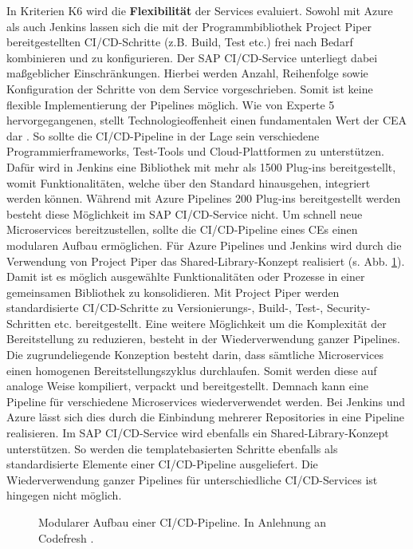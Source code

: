 In Kriterien K6 wird die \textbf{Flexibilität} der Services evaluiert. Sowohl mit Azure als auch Jenkins lassen sich die mit der Programmbibliothek Project Piper bereitgestellten CI/CD-Schritte (z.B. Build, Test etc.) frei nach Bedarf kombinieren und zu konfigurieren. Der SAP CI/CD-Service unterliegt dabei maßgeblicher Einschränkungen. Hierbei werden Anzahl, Reihenfolge sowie Konfiguration der Schritte von dem Service vorgeschrieben. Somit ist keine flexible Implementierung der Pipelines möglich. Wie von Experte 5 hervorgegangenen, stellt Technologieoffenheit einen fundamentalen Wert der CEA dar \cite[Z. 10]{SoftwareArchitektSAPDTSIntegration.}. So sollte die CI/CD-Pipeline in der Lage sein verschiedene Programmierframeworks, Test-Tools und Cloud-Plattformen zu unterstützen. Dafür wird in Jenkins eine Bibliothek mit mehr als 1500 Plug-ins bereitgestellt, womit Funktionalitäten, welche über den Standard hinausgehen, integriert werden können. Während mit Azure Pipelines 200 Plug-ins bereitgestellt werden besteht diese Möglichkeit im SAP CI/CD-Service nicht. Um schnell neue Microservices bereitzustellen, sollte die CI/CD-Pipeline eines CEs einen modularen Aufbau ermöglichen. Für Azure Pipelines und Jenkins wird durch die Verwendung von Project Piper das Shared-Library-Konzept realisiert (s. Abb. \ref{fig:Modular}). Damit ist es möglich ausgewählte Funktionalitäten oder Prozesse in einer gemeinsamen Bibliothek zu konsolidieren. Mit Project Piper werden standardisierte CI/CD-Schritte zu Versionierungs-, Build-, Test-, Security-Schritten etc. bereitgestellt. Eine weitere Möglichkeit um die Komplexität der Bereitstellung zu reduzieren, besteht in der Wiederverwendung ganzer Pipelines. Die zugrundeliegende Konzeption besteht darin, dass sämtliche Microservices einen homogenen Bereitstellungszyklus durchlaufen. Somit werden diese auf analoge Weise kompiliert, verpackt und bereitgestellt. Demnach kann eine Pipeline für verschiedene Microservices wiederverwendet werden. Bei Jenkins und Azure lässt sich dies durch die Einbindung mehrerer Repositories in eine Pipeline realisieren. Im SAP CI/CD-Service wird ebenfalls ein Shared-Library-Konzept unterstützen. So werden die templatebasierten Schritte ebenfalls als standardisierte Elemente einer CI/CD-Pipeline ausgeliefert. Die Wiederverwendung ganzer Pipelines für unterschiedliche CI/CD-Services ist hingegen nicht möglich.
\begin{center}
	\begin{figure}[H]
		\centering
		\caption[Modularer Aufbau einer CI/CD-Pipeline]{Modularer Aufbau einer CI/CD-Pipeline. In Anlehnung an Codefresh \cite{.20230402}.}
		\label{fig:Modular}
	\end{figure}
\end{center}
